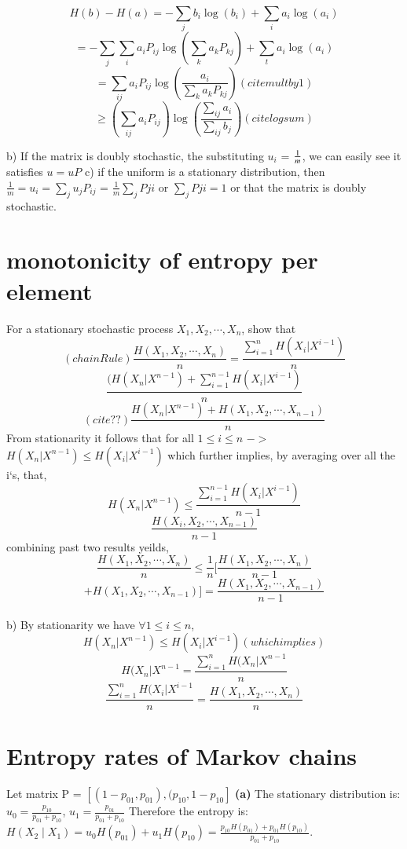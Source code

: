 \documentclass[10pt]{article}
\begin{document}
\begin{tiny}
\begin{multicols}{3}
\[H(b) - H(a) = -\sum_j b_i \log (b_i) + \sum_i a_i \log (a_i)  \]
\[= - \sum_j \sum_i a_iP_{ij} \log(\sum_k a_kP_{kj})+\sum_t a_i \log (a_i) \]	
\[= \sum_{ij}a_iP_{ij} \log(\frac{ a_i }{\sum_{k} a_kP_{kj}}) (cite mult by 1)\]	
\[ \ge (\sum_{ij}a_iP_{ij}) \log(\frac{\sum_{ij} a_i }{\sum_{ij} b_j }) (cite log sum)\]	

b) If the matrix is doubly stochastic, the substituting $u_i$ = $1\over{m}$, we can easily see it satisfies $u=uP$
c) if the uniform is a stationary distribution, then $\frac{1}{m} = u_i = \sum_{j}u_{j}P_{ij}$ = $ \frac{1}{m}\sum_jP{ji}$ or $\sum_jP{ji}=1$ or that the matrix is doubly stochastic.


\section*{monotonicity of entropy per element}
For a stationary stochastic process $X_1, X_2, \cdots , X_n$, show that
\[ (chainRule)  \frac{H(X_1,X_2,\cdots,X_n)}{n} = \frac{\sum_{i=1}^n H(X_i | X^{i-1})}{n} \]
\[ \frac{(H(X_n | X^{n-1}) + \sum_{i=1}^{n-1} H(X_i |X^{i-1}) } {n} \]
\[ (cite??) \frac{H(X_n | X^{n-1}) + H(X_1,X_2,\cdots,X_{n-1}) } {n} \]
From stationarity it follows that for all $1\le i \le n$ $->$ $H(X_n | X^{n-1}) \le H(X_i | X^{i-1}) $
which further implies, by averaging over all the i`s, that,
\[ H(X_n | X^{n-1}) \le \frac{ \sum_{i=1}^{n-1} H(X_i | X^{i-1})} {n-1} \]
\[ \frac{ H(X_i,X_2,\cdots,X_{n-1})} {n-1} \]
combining past two results yeilds, 
\[ \frac{H(X_1,X_2,\cdots,X_n)}{n} \le \frac{1}{n} [ \frac{ H(X_1,X_2,\cdots,X_n) } {n-1}\]
\[ + H(X_1,X_2,\cdots,X_{n-1}) ]  = \frac{H(X_1,X_2,\cdots,X_{n-1})}{n-1} \]
\\
b) By stationarity we have $\forall 1 \le i \le n$,
\[ H(X_n | X^{n-1} ) \le H(X_i | X^{i-1}) (whichimplies)\]
\[H(X_n | X^{n-1} = \frac{\sum_{i=1}^n H(X_n | X^{n-1} } {n} \]
\[ \frac{\sum_{i=1}^n H(X_i | X^{i-1} } {n} = \frac{H(X_1,X_2,\cdots,X_n)}{n}\]

\section*{Entropy rates of Markov chains}

Let matrix P = $[ (1-p_{01}, p_{01}), (p_{10}, 1-p_{10}]$ 
\textbf{(a)} The stationary distribution is: $u_0=\frac{p_{10}}{p_{01}+p_{10}}$, $u_1=\frac{p_{01}}{p_{01}+p_{10}}$
Therefore the entropy is: \( H(X_2 \mid X_1) = u_0H(p_{01})+u_1H(p_{10}) = \frac{p_{10}H(p_{01})+ p_{01}H(p_{10})}{p_{01}+p_{10}}. \)


\end{multicols}
\end{tiny}
\end{document}
